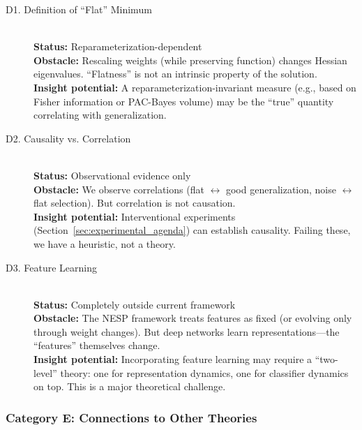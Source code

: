 \documentclass[
  journal=largetwo,
  year=2025,
  volume=37,
]{cup-journal}
\begin{document}
\begin{description}
    \item[D1. Definition of ``Flat'' Minimum] \hfill \\
    \textbf{Status:} Reparameterization-dependent \\
    \textbf{Obstacle:} Rescaling weights (while preserving function) changes Hessian eigenvalues. ``Flatness'' is not an intrinsic property of the solution. \\
    \textbf{Insight potential:} A reparameterization-invariant measure (e.g., based on Fisher information or PAC-Bayes volume) may be the ``true'' quantity correlating with generalization.
    
    \item[D2. Causality vs. Correlation] \hfill \\
    \textbf{Status:} Observational evidence only \\
    \textbf{Obstacle:} We observe correlations (flat $\leftrightarrow$ good generalization, noise $\leftrightarrow$ flat selection). But correlation is not causation. \\
    \textbf{Insight potential:} Interventional experiments (Section~\ref{sec:experimental_agenda}) can establish causality. Failing these, we have a heuristic, not a theory.
    
    \item[D3. Feature Learning] \hfill \\
    \textbf{Status:} Completely outside current framework \\
    \textbf{Obstacle:} The NESP framework treats features as fixed (or evolving only through weight changes). But deep networks learn representations---the ``features'' themselves change. \\
    \textbf{Insight potential:} Incorporating feature learning may require a ``two-level'' theory: one for representation dynamics, one for classifier dynamics on top. This is a major theoretical challenge.
\end{description}

\subsubsection{Category E: Connections to Other Theories}
\end{document}

